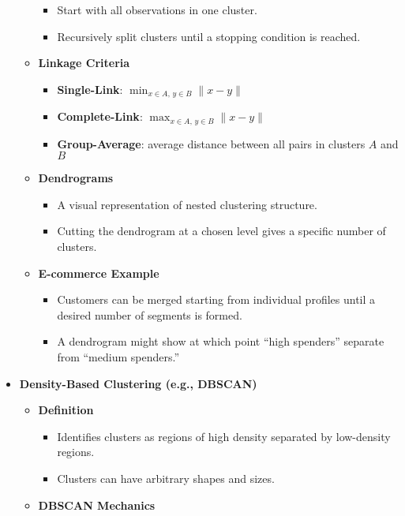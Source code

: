 \documentclass[10pt]{article}
\begin{document}
\begin{itemize}
\begin{itemize}
        \begin{itemize}
            \item Start with all observations in one cluster.
            \item Recursively split clusters until a stopping condition is reached.
        \end{itemize}
        \item \textbf{Linkage Criteria}
        \begin{itemize}
            \item \textbf{Single-Link}: $\displaystyle \min_{x \in A, \, y \in B} \| x - y \|$
            \item \textbf{Complete-Link}: $\displaystyle \max_{x \in A, \, y \in B} \| x - y \|$
            \item \textbf{Group-Average}: average distance between all pairs in clusters $A$ and $B$
        \end{itemize}
        \item \textbf{Dendrograms}
        \begin{itemize}
            \item A visual representation of nested clustering structure.
            \item Cutting the dendrogram at a chosen level gives a specific number of clusters.
        \end{itemize}
        \item \textbf{E-commerce Example}
        \begin{itemize}
            \item Customers can be merged starting from individual profiles until a desired number of segments is formed.
            \item A dendrogram might show at which point “high spenders” separate from “medium spenders.”
        \end{itemize}
    \end{itemize}
    \item \textbf{Density-Based Clustering (e.g., DBSCAN)}
    \begin{itemize}
        \item \textbf{Definition}
        \begin{itemize}
            \item Identifies clusters as regions of high density separated by low-density regions.
            \item Clusters can have arbitrary shapes and sizes.
        \end{itemize}
        \item \textbf{DBSCAN Mechanics}

\end{itemize}
\end{itemize}
\end{document}
